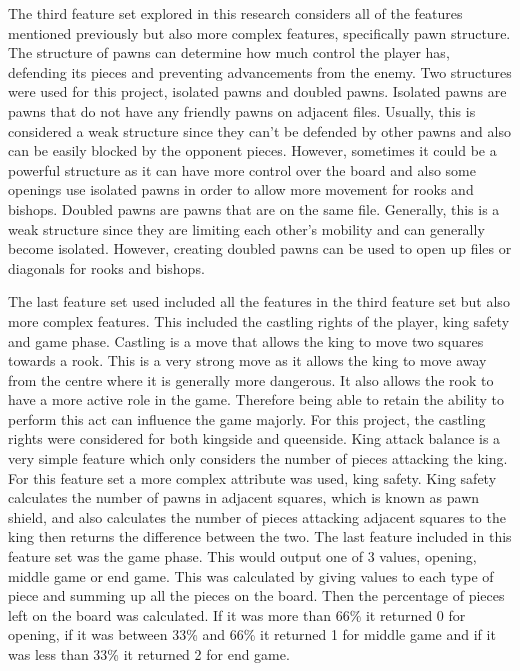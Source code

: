 The third feature set explored in this research considers all of the features mentioned previously but also more complex features, specifically pawn structure. The structure of pawns can determine how much control the player has, defending its pieces and preventing advancements from the enemy. Two structures were used for this project, isolated pawns and doubled pawns. Isolated pawns are pawns that do not have any friendly pawns on adjacent files. Usually, this is considered a weak structure since they can't be defended by other pawns and also can be easily blocked by the opponent pieces. However, sometimes it could be a powerful structure as it can have more control over the board and also some openings use isolated pawns in order to allow more movement for rooks and bishops. 
Doubled pawns are pawns that are on the same file. Generally, this is a weak structure since they are limiting each other's mobility and can generally become isolated. However, creating doubled pawns can be used to open up files or diagonals for rooks and bishops.

The last feature set used included all the features in the third feature set but also more complex features. This included the castling rights of the player, king safety and game phase. Castling is a move that allows the king to move two squares towards a rook. This is a very strong move as it allows the king to move away from the centre where it is generally more dangerous. It also allows the rook to have a more active role in the game. Therefore being able to retain the ability to perform this act can influence the game majorly. For this project, the castling rights were considered for both kingside and queenside. King attack balance is a very simple feature which only considers the number of pieces attacking the king.  For this feature set a more complex attribute was used, king safety. King safety calculates the number of pawns in adjacent squares, which is known as pawn shield, and also calculates the number of pieces attacking adjacent squares to the king then returns the difference between the two. The last feature included in this feature set was the game phase. This would output one of 3 values, opening, middle game or end game. This was calculated by giving values to each type of piece and summing up all the pieces on the board. Then the percentage of pieces left on the board was calculated. If it was more than 66\% it returned 0 for opening, if it was between 33\% and 66\% it returned 1 for middle game and if it was less than 33\% it returned 2 for end game.


